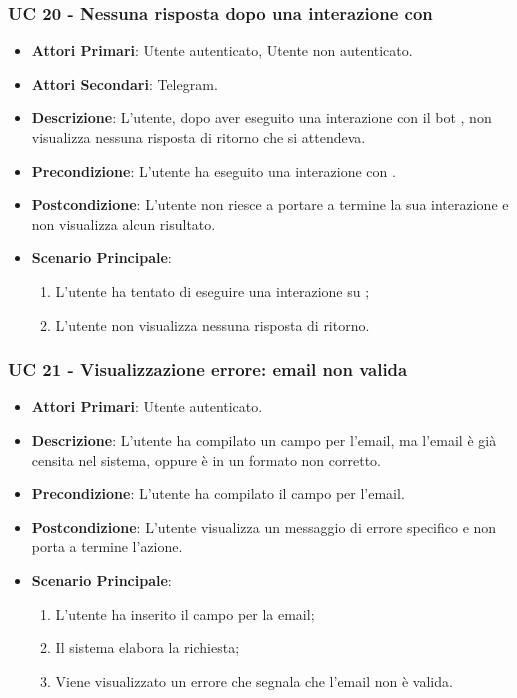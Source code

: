 
		\subsubsection{UC 20 - Nessuna risposta dopo una interazione con }
		\begin{itemize}
			\item \textbf{Attori Primari}: Utente autenticato, Utente non autenticato.
			\item \textbf{Attori Secondari}: Telegram.
			\item \textbf{Descrizione}: L'utente, dopo aver eseguito una interazione con il bot , non visualizza nessuna risposta di ritorno che si attendeva.
			\item \textbf{Precondizione}: L'utente ha eseguito una interazione con .
			\item \textbf{Postcondizione}: L'utente non riesce a portare a termine la sua interazione e non visualizza alcun risultato.
			\item \textbf{Scenario Principale}:
			\begin{enumerate}
				\item L'utente ha tentato di eseguire una interazione su ;
				\item L'utente non visualizza nessuna risposta di ritorno.
			\end{enumerate}
		\end{itemize}



		\subsubsection{UC 21 - Visualizzazione errore: email non valida}
		\begin{itemize}
			\item \textbf{Attori Primari}: Utente autenticato.
			\item \textbf{Descrizione}: L'utente ha compilato un campo per l'email, ma l'email è già censita nel sistema, oppure è in un formato non corretto.
			\item \textbf{Precondizione}: L'utente ha compilato il campo per l'email.
			\item \textbf{Postcondizione}: L'utente visualizza un messaggio di errore specifico e non porta a termine l'azione.
			\item \textbf{Scenario Principale}:
			\begin{enumerate}
				\item L'utente ha inserito il campo per la email;
				\item Il sistema elabora la richiesta;
				\item Viene visualizzato un errore che segnala che l'email non è valida.
			\end{enumerate}
		\end{itemize}


